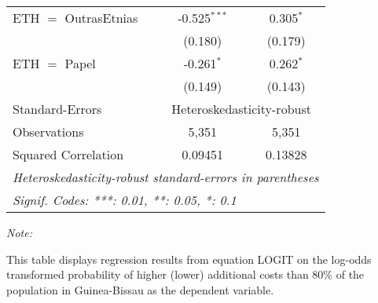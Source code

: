 \begin{table}[htbp!]
\begin{adjustbox}{width = 1\textwidth, max height = 0.95\textheight, center}
\begin{threeparttable}[b]
\begin{tabular}{lcc}
            ETH $=$ OutrasEtnias & -0.525$^{***}$ & 0.305$^{*}$\\   
                                 & (0.180)        & (0.179)\\   
            ETH $=$ Papel        & -0.261$^{*}$   & 0.262$^{*}$\\   
                                 & (0.149)        & (0.143)\\   
            \midrule 
            Standard-Errors & \multicolumn{2}{c}{Heteroskedasticity-robust} \\ 
            Observations         & 5,351          & 5,351\\  
            Squared Correlation  & 0.09451        & 0.13828\\  
            \midrule \midrule
            \multicolumn{3}{l}{\emph{Heteroskedasticity-robust standard-errors in parentheses}}\\
            \multicolumn{3}{l}{\emph{Signif. Codes: ***: 0.01, **: 0.05, *: 0.1}}\\
         \end{tabular}
         
         \begin{tablenotes}\item \medskip \textit{Note:}
            \item This table displays regression results from equation LOGIT on the log-odds transformed probability of higher (lower) additional costs than 80\% of the population in Guinea-Bissau as the dependent variable. 
         \end{tablenotes}
      \end{threeparttable}
   \end{adjustbox}
\end{table}


